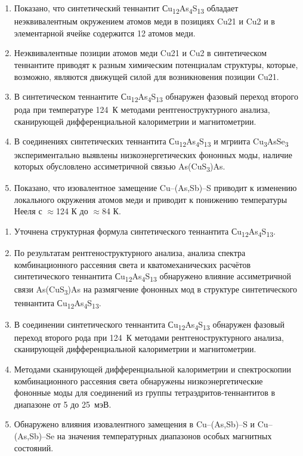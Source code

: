 \begin{enumerate}
\item Показано, что синтетический теннантит Сu\textsubscript{12}As\textsubscript{4}S\textsubscript{13} обладает неэквивалентным  окружением атомов меди в позициях Cu21 и Cu2 и в элементарной ячейке содержится 12 атомов меди.
\item Неэквивалентные позиции атомов меди Cu21 и Cu2 в синтетическом теннантите приводят к разным химическим потенциалам структуры, которые, возможно, являются движущей силой для возникновения позиции Cu21.
\item В синтетическом теннантите Сu\textsubscript{12}As\textsubscript{4}S\textsubscript{13} обнаружен фазовый переход второго рода при температуре 124~К методами рентгеноструктурного анализа, сканирующей дифференциальной калориметрии и магнитометрии.
\item В соединениях синтетических теннантита Сu\textsubscript{12}As\textsubscript{4}S\textsubscript{13} и мгриита Cu\textsubscript{3}AsSe\textsubscript{3} экспериментально выявлены низкоэнергетических фононных моды, наличие которых обусловлено  ассиметричной связью As(CuS\textsubscript{3})As.
\item Показано, что изовалентное замещение Cu--(As,Sb)--S приводит к изменению локального окружения атомов меди и приводит к понижению температуры Нееля с $\approx$124 К до $\approx$84 К.

\end{enumerate}

\novelty
\begin{enumerate}
\item Уточнена структурная формула синтетического теннантита Сu\textsubscript{12}As\textsubscript{4}S\textsubscript{13}.
\item По результатам рентгеноструктурного анализа, анализа спектра комбинационного рассеяния света и кватомеханических расчётов синтетического теннантита Сu\textsubscript{12}As\textsubscript{4}S\textsubscript{13} обнаружено влияние ассиметричной связи As(CuS\textsubscript{3})As на размягчение фононных мод в структуре синтетического теннантита Сu\textsubscript{12}As\textsubscript{4}S\textsubscript{13}.
\item В соединении  синтетического теннантита Сu\textsubscript{12}As\textsubscript{4}S\textsubscript{13} обнаружен фазовый переход второго рода
 при 124~К методами рентгеноструктурного анализа, сканирующей дифференциальной калориметрии и магнитометрии.
\item Методами сканирующей дифференциальной калориметрии и спектроскопии комбинационного рассеяния света обнаружены низкоэнергетические фононные моды для соединений из группы тетраэдритов-теннантитов в диапазоне от 5 до 25~мэВ.
\item Обнаружено влияния изовалентного замещения в Cu--(As,Sb)--S и  Cu--(As,Sb)--Se на значения температурных диапазонов  особых магнитных состояний.
\end{enumerate}

